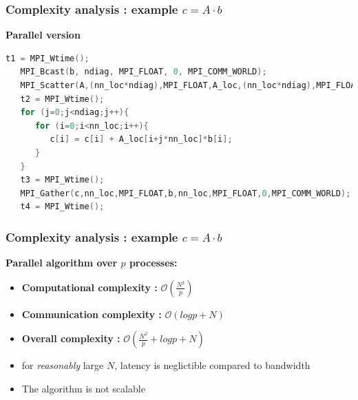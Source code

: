 \begin{frame}[containsverbatim]
\frametitle{Complexity analysis : example $c = A \cdot b$}
\textbf{Parallel version}
\begin{lstlisting}[language=C,frame=lines]
   t1 = MPI_Wtime();
   MPI_Bcast(b, ndiag, MPI_FLOAT, 0, MPI_COMM_WORLD);
   MPI_Scatter(A,(nn_loc*ndiag),MPI_FLOAT,A_loc,(nn_loc*ndiag),MPI_FLOAT,0,MPI_COMM_WORLD);
   t2 = MPI_Wtime();		
   for (j=0;j<ndiag;j++){
      for (i=0;i<nn_loc;i++){
         c[i] = c[i] + A_loc[i+j*nn_loc]*b[i];
      }
   }
   t3 = MPI_Wtime();
   MPI_Gather(c,nn_loc,MPI_FLOAT,b,nn_loc,MPI_FLOAT,0,MPI_COMM_WORLD);
   t4 = MPI_Wtime();
\end{lstlisting}
\end{frame}





\begin{frame}[containsverbatim]
\frametitle{Complexity analysis : example $c = A \cdot b$}
\textbf{Parallel algorithm over $p$ processes:}
\begin{itemize}
	\item{\textbf{Computational complexity :} $\mathcal{O}(\frac{N^2}{p})$}
	\item{\textbf{Communication complexity :} $\mathcal{O}(log p + N)$}
	\item{\textbf{Overall complexity :} $\mathcal{O}(\frac{N^2}{p} + log p + N)$}
	\item{for \textit{reasonably} large $N$, latency is neglictible compared to bandwidth}
	\item{The algorithm is not scalable}
\end{itemize}
\end{frame}







